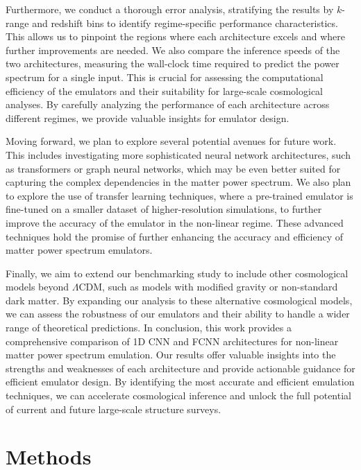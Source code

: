 \documentclass[twocolumn]{aastex631}
\begin{document}
\noindent Furthermore, we conduct a thorough error analysis, stratifying the results by \(k\)-range and redshift bins to identify regime-specific performance characteristics. This allows us to pinpoint the regions where each architecture excels and where further improvements are needed. We also compare the inference speeds of the two architectures, measuring the wall-clock time required to predict the power spectrum for a single input. This is crucial for assessing the computational efficiency of the emulators and their suitability for large-scale cosmological analyses. By carefully analyzing the performance of each architecture across different regimes, we provide valuable insights for emulator design.

\noindent Moving forward, we plan to explore several potential avenues for future work. This includes investigating more sophisticated neural network architectures, such as transformers or graph neural networks, which may be even better suited for capturing the complex dependencies in the matter power spectrum. We also plan to explore the use of transfer learning techniques, where a pre-trained emulator is fine-tuned on a smaller dataset of higher-resolution simulations, to further improve the accuracy of the emulator in the non-linear regime. These advanced techniques hold the promise of further enhancing the accuracy and efficiency of matter power spectrum emulators.

\noindent Finally, we aim to extend our benchmarking study to include other cosmological models beyond \(\Lambda\)CDM, such as models with modified gravity or non-standard dark matter. By expanding our analysis to these alternative cosmological models, we can assess the robustness of our emulators and their ability to handle a wider range of theoretical predictions. In conclusion, this work provides a comprehensive comparison of 1D CNN and FCNN architectures for non-linear matter power spectrum emulation. Our results offer valuable insights into the strengths and weaknesses of each architecture and provide actionable guidance for efficient emulator design. By identifying the most accurate and efficient emulation techniques, we can accelerate cosmological inference and unlock the full potential of current and future large-scale structure surveys.




\section{Methods}
\label{sec:methods}
\end{document}
